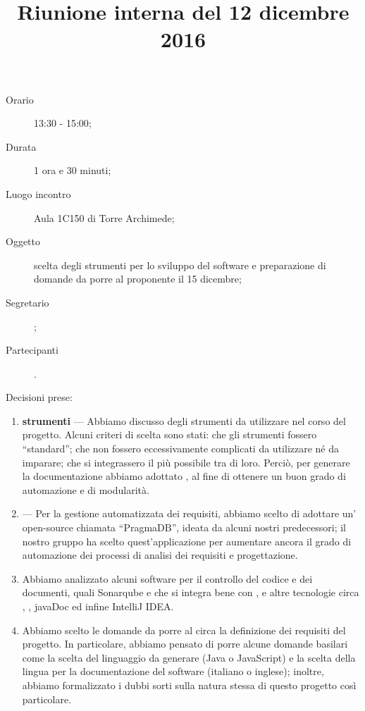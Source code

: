 


\author{\PB}
\supervisor{\MM}
\title{Riunione interna del 12 dicembre 2016}



\maketitle

\begin{description}
	\item[Orario] 13:30 - 15:00;
	\item[Durata] 1 ora e 30 minuti;
	\item[Luogo incontro] Aula 1C150 di Torre Archimede;
	\item[Oggetto] scelta degli strumenti per lo sviluppo del software e preparazione di domande da porre al proponente il 15 dicembre;
	\item[Segretario] \PB; 
	\item[Partecipanti] \ALL.
\end{description}

Decisioni prese:
\begin{enumerate}
	\item \textbf{strumenti} --- Abbiamo discusso degli strumenti da utilizzare nel corso del progetto. Alcuni criteri di scelta sono stati: che gli strumenti fossero “standard”; che non fossero eccessivamente complicati da utilizzare né da imparare; che si integrassero il più possibile tra di loro. Perciò, per generare la documentazione abbiamo adottato , al fine di ottenere un buon grado di automazione e di modularità.
	\item \textbf{} --- Per la gestione automatizzata dei requisiti, abbiamo scelto di adottare un' open-source chiamata “PragmaDB”, ideata da alcuni nostri predecessori; il nostro gruppo ha scelto quest'applicazione per aumentare ancora il grado di automazione dei processi di analisi dei requisiti e progettazione.
	\item Abbiamo analizzato alcuni software per il controllo del codice e dei documenti, quali Sonarqube e  che si integra bene con , e altre tecnologie circa , , javaDoc ed infine IntelliJ IDEA.
	\item Abbiamo scelto le domande da porre al \GP circa la definizione dei requisiti del progetto. In particolare, abbiamo pensato di porre alcune domande basilari come la scelta del linguaggio da generare (Java o JavaScript) e la scelta della lingua per la documentazione del software (italiano o inglese); inoltre, abbiamo formalizzato i dubbi sorti sulla natura stessa di questo progetto così particolare.
\end{enumerate}

